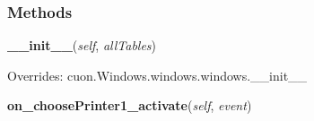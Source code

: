 
  \subsubsection{Methods}

    \label{cuon:Skeleton:webshop:webshopwindow:__init__}
    \vspace{0.5ex}

    \begin{boxedminipage}{\textwidth}

    \raggedright \textbf{\_\_init\_\_}(\textit{self}, \textit{allTables})

      Overrides: cuon.Windows.windows.windows.\_\_init\_\_

    \end{boxedminipage}

    \label{cuon:Skeleton:webshop:webshopwindow:on_choosePrinter1_activate}
    \vspace{0.5ex}

    \begin{boxedminipage}{\textwidth}

    \raggedright \textbf{on\_choosePrinter1\_activate}(\textit{self}, \textit{event})

    \end{boxedminipage}

